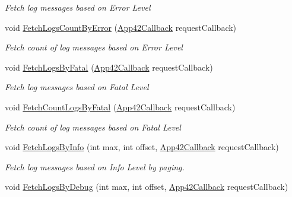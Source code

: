 \begin{DoxyCompactItemize}
\begin{DoxyCompactList}\small\item\em Fetch log messages based on Error Level \end{DoxyCompactList}\item 
void \hyperlink{classcom_1_1shephertz_1_1app42_1_1paas_1_1sdk_1_1windows_1_1log_1_1_log_service_a13fd4724d88384dea5c860bb06c115b4}{Fetch\+Logs\+Count\+By\+Error} (\hyperlink{interfacecom_1_1shephertz_1_1app42_1_1paas_1_1sdk_1_1windows_1_1_app42_callback}{App42\+Callback} request\+Callback)
\begin{DoxyCompactList}\small\item\em Fetch count of log messages based on Error Level \end{DoxyCompactList}\item 
void \hyperlink{classcom_1_1shephertz_1_1app42_1_1paas_1_1sdk_1_1windows_1_1log_1_1_log_service_ab1ccad3f6c8d98fab10565750dabbfa7}{Fetch\+Logs\+By\+Fatal} (\hyperlink{interfacecom_1_1shephertz_1_1app42_1_1paas_1_1sdk_1_1windows_1_1_app42_callback}{App42\+Callback} request\+Callback)
\begin{DoxyCompactList}\small\item\em Fetch log messages based on Fatal Level \end{DoxyCompactList}\item 
void \hyperlink{classcom_1_1shephertz_1_1app42_1_1paas_1_1sdk_1_1windows_1_1log_1_1_log_service_a1ba7fe0555c6287d745c8ba4932627ea}{Fetch\+Count\+Logs\+By\+Fatal} (\hyperlink{interfacecom_1_1shephertz_1_1app42_1_1paas_1_1sdk_1_1windows_1_1_app42_callback}{App42\+Callback} request\+Callback)
\begin{DoxyCompactList}\small\item\em Fetch count of log messages based on Fatal Level \end{DoxyCompactList}\item 
void \hyperlink{classcom_1_1shephertz_1_1app42_1_1paas_1_1sdk_1_1windows_1_1log_1_1_log_service_a775aa8b7075ab036b42c89f41b5875b8}{Fetch\+Logs\+By\+Info} (int max, int offset, \hyperlink{interfacecom_1_1shephertz_1_1app42_1_1paas_1_1sdk_1_1windows_1_1_app42_callback}{App42\+Callback} request\+Callback)
\begin{DoxyCompactList}\small\item\em Fetch log messages based on Info Level by paging. \end{DoxyCompactList}\item 
void \hyperlink{classcom_1_1shephertz_1_1app42_1_1paas_1_1sdk_1_1windows_1_1log_1_1_log_service_afe1b255b741b4ca570feefef5edb10f9}{Fetch\+Logs\+By\+Debug} (int max, int offset, \hyperlink{interfacecom_1_1shephertz_1_1app42_1_1paas_1_1sdk_1_1windows_1_1_app42_callback}{App42\+Callback} request\+Callback)

\end{DoxyCompactItemize}
